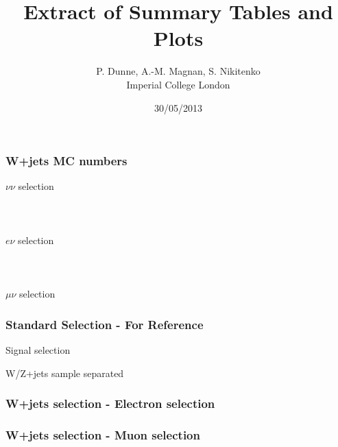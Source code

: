 \documentclass[red,compress,xcolor=table]{beamer}
\title%
{Extract of Summary Tables and Plots}
\subtitle
{} %
\author[A.-M. Magnan] %
{P. Dunne, A.-M. Magnan, S. Nikitenko\\
  Imperial College London}
\date[30/05/2013] %
{30/05/2013}
\begin{document}
\begin{frame}
  \frametitle{W+jets MC numbers}

{\tiny
\centering $\nu\nu$ selection\\
\\
\\
\\
\centering $e\nu$ selection\\
\\
\\
\\
\centering $\mu\nu$ selection\\



}

\end{frame}

\begin{frame}
  \frametitle{Standard Selection - For Reference}

\begin{center}
\centering Signal selection\\
{\tiny
\hspace*{-1cm}

}
\centering W/Z+jets sample separated\\
  {\tiny
    
  }

\end{center}

\end{frame}

\begin{frame}
  \frametitle{W+jets selection -  Electron selection}

\vspace*{-1cm}
\begin{center}
{\tiny
\hspace*{-1cm}

}
\end{center}


\end{frame}
\begin{frame}
  \frametitle{W+jets selection -  Muon selection}

\vspace*{-1cm}
\begin{center}
{\tiny
\hspace*{-1cm}

}
\end{center}


\end{frame}
\end{document}
